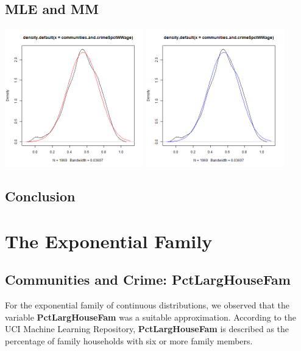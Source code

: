 \documentclass[12pt, letterpaper]{report}
\begin{document}
\section{MLE and MM}


\begin{center}
\includegraphics[width=0.45\textwidth]{normal/pctWWage_mle}
\includegraphics[width=0.45\textwidth]{normal/pctWWage_mm}
\end{center}

\section{Conclusion}


\maketitle
\chapter{The Exponential Family}
\section{Communities and Crime: PctLargHouseFam}

For the exponential family of continuous distributions, we observed that the variable \textbf{PctLargHouseFam} was a suitable approximation. 
According to the UCI Machine Learning Repository, \textbf{PctLargHouseFam} is described as the percentage of family households with six or more family members. 
\end{document}
